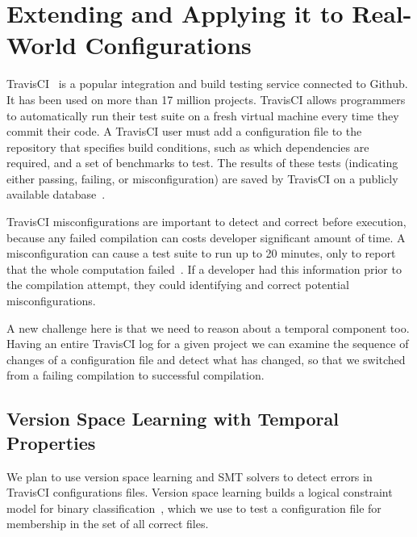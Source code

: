 
\section{Extending \app and Applying it to Real-World Configurations}
\label{sec:travis}

TravisCI~\cite{API} is a popular integration and build testing service 
connected to Github. It has been used on more than 17 
million projects. 
TravisCI allows programmers to automatically run their test suite on a fresh virtual machine every time they commit their code.
A TravisCI user must add a configuration file to the repository that specifies build conditions, 
such as which dependencies are required, and a set of benchmarks to test. 
The results of these tests (indicating either passing, failing, or misconfiguration) 
are saved by TravisCI on a publicly available database~\cite{API}.

TravisCI misconfigurations are important to detect and correct before execution,
because any failed compilation can costs developer significant amount 
of time. A misconfiguration can cause a test suite to run up to 20 
minutes, only to report that the whole computation failed~\cite{API}.
If a developer had this information prior to the compilation attempt, they could
 identifying and correct potential misconfigurations.

A new challenge here is that we need to reason about a 
temporal component too. Having an entire TravisCI log for a given
project we can examine the sequence of changes of a configuration file
and detect what has changed, so that we switched from a failing 
compilation to successful compilation. 


\subsection{Version Space Learning with Temporal Properties} 

We plan to use version space learning and SMT solvers to detect errors in 
TravisCI configurations files. Version space learning 
builds a logical constraint model for binary
classification~\cite{mitchell77}, which we use to test a configuration file for 
membership in the set of all correct files.

